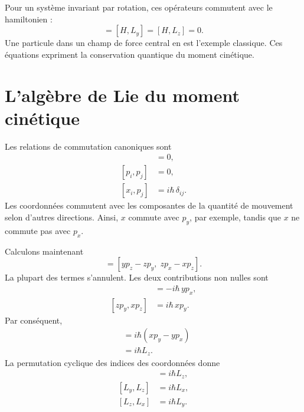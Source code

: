 Pour un système invariant par rotation, ces opérateurs commutent avec le hamiltonien :
\begin{equation}
[H,L_x]=[H,L_y]=[H,L_z]=0.
\end{equation}
Une particule dans un champ de force central en est l’exemple classique. Ces équations expriment la conservation quantique du moment cinétique.

\section{L’algèbre de Lie du moment cinétique}

Les relations de commutation canoniques sont
\begin{align}
[x_i,x_j]&=0,\\
[p_i,p_j]&=0,\\
[x_i,p_j]&=i\hbar\,\delta_{ij}.
\end{align}
Les coordonnées commutent avec les composantes de la quantité de mouvement selon d’autres directions. Ainsi, \(x\) commute avec \(p_y\), par exemple, tandis que \(x\) ne commute pas avec \(p_x\).

Calculons maintenant
\begin{equation}
[L_x,L_y]
=
[yp_z-zp_y,\;zp_x-xp_z].
\end{equation}
La plupart des termes s’annulent. Les deux contributions non nulles sont
\begin{align}
[yp_z,zp_x]&=-i\hbar\,yp_x,\\
[zp_y,xp_z]&=i\hbar\,xp_y.
\end{align}
Par conséquent,
\begin{align}
[L_x,L_y]
&=i\hbar\left(xp_y-yp_x\right)\\
&=i\hbar L_z.
\end{align}
La permutation cyclique des indices des coordonnées donne
\begin{align}
[L_x,L_y]&=i\hbar L_z,\\
[L_y,L_z]&=i\hbar L_x,\\
[L_z,L_x]&=i\hbar L_y.
\end{align}

\begin{classroomqa}
\end{classroomqa}

